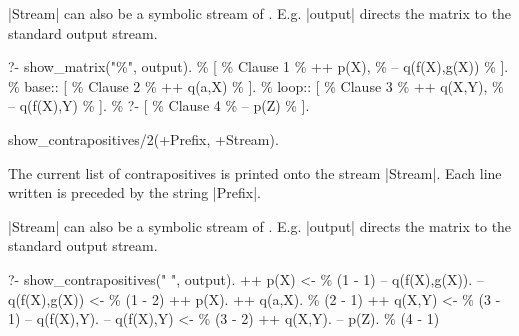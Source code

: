 |Stream| can also be a symbolic stream of \eclipse. E.g. |output| directs the
matrix to the standard output stream.
\begin{BoxedSample}
  ?- show\_matrix("\%", output).
  \%      [ \% Clause 1
  \%        ++ p(X),
  \%        -- q(f(X),g(X))
  \%      ].
  \% base:: [  \% Clause 2
  \%        ++ q(a,X)
  \%      ].
  \% loop:: [  \% Clause 3
  \%        ++ q(X,Y),
  \%        -- q(f(X),Y)
  \%      ].
  \% ?-   [  \% Clause 4
  \%         -- p(Z)
  \%      ].
\end{BoxedSample}

\Predicate show_contrapositives/2(+Prefix, +Stream).

The current list of contrapositives is printed onto the stream |Stream|.  Each
line written is preceded by the string |Prefix|.

|Stream| can also be a symbolic stream of \eclipse. E.g. |output| directs the
matrix to the standard output stream.
\begin{BoxedSample}
  ?- show\_contrapositives(" ", output).
    ++ p(X) <- \% (1 - 1)
           -- q(f(X),g(X)).
    -- q(f(X),g(X)) <- \% (1 - 2)
           ++ p(X).
    ++ q(a,X). \% (2 - 1)
    ++ q(X,Y) <- \% (3 - 1)
           -- q(f(X),Y).
    -- q(f(X),Y) <- \% (3 - 2)
           ++ q(X,Y).
    -- p(Z). \% (4 - 1)
\end{BoxedSample}

%

